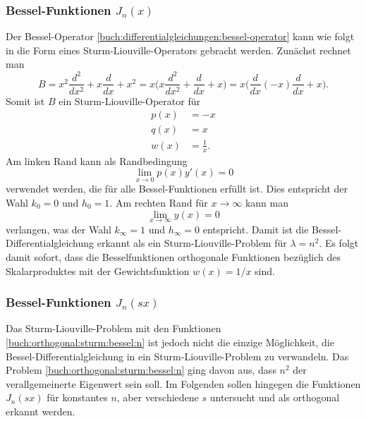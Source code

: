 \subsubsection{Bessel-Funktionen $J_n(x)$}
Der Bessel-Operator \eqref{buch:differentialgleichungen:bessel-operator}
kann wie folgt in die Form eines Sturm-Liouville-Operators gebracht 
werden.
Zunächst rechnet man
\[
B
=
x^2\frac{d^2}{dx^2} + x\frac{d}{dx} + x^2
=
x\biggl(
x\frac{d^2}{dx^2} + \frac{d}{dx} + x
\biggr)
=
x\biggl(
\frac{d}{dx}(-x)\frac{d}{dx} + x
\biggr).
\]
Somit ist $B$ ein Sturm-Liouville-Operator für 
\begin{equation}
\begin{aligned}
p(x) &= -x \\
q(x) &= x \\
w(x) &= \frac{1}{x}.
\end{aligned}
\label{buch:orthogonal:sturm:bessel:n}
\end{equation}
Am linken Rand kann als Randbedingung 
\[
\lim_{x\to 0} p(x) y'(x) = 0
\]
verwendet werden, die für alle Bessel-Funktionen erfüllt ist.
Dies entspricht der Wahl $k_0=0$ und $h_0=1$.
Am rechten Rand für $x\to\infty$ kann man
\[
\lim_{x\to\infty} y(x)=0
\]
verlangen, was der Wahl $k_\infty=1$ und $h_\infty=0$ entspricht.
Damit ist die Bessel-Differentialgleichung erkannt als ein
Sturm-Liouville-Problem für $\lambda=n^2$.
Es folgt damit sofort, dass die Besselfunktionen orthogonale
Funktionen bezüglich des Skalarproduktes mit der Gewichtsfunktion
$w(x)=1/x$ sind.

\subsubsection{Bessel-Funktionen $J_n(s x)$}
Das Sturm-Liouville-Problem mit den Funktionen
\eqref{buch:orthogonal:sturm:bessel:n}
ist jedoch nicht die einzige Möglichkeit, die Bessel-Differentialgleichung
in ein Sturm-Liouville-Problem zu verwandeln.
Das Problem \eqref{buch:orthogonal:sturm:bessel:n} ging davon
aus, dass $n^2$ der verallgemeinerte Eigenwert sein soll.
Im Folgenden sollen hingegen die Funktionen $J_n(s x)$ für
konstantes $n$, aber verschiedene $s$ untersucht und
als orthogonal erkannt werden.

